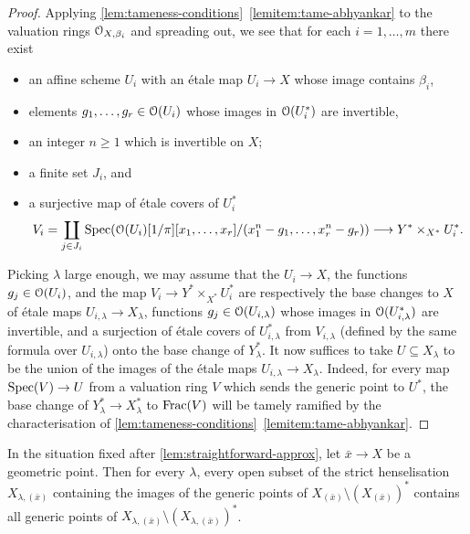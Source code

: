 \begin{proof}
Applying \cref{lem:tameness-conditions}~\ref{lemitem:tame-abhyankar} to the valuation rings ${\mathcal O}_{X,\beta_i}$ and spreading out, we see that for each $i=1,\dots, m$ there exist
\begin{itemize}
    \item 
    an affine scheme $U_i$ with an \'etale map $U_i\to X$ whose image contains $\beta_i$,
    \item 
    elements $g_1,\dots, g_r\in {\mathcal O}(U_i)$ whose images in ${\mathcal O}(U_i^*)$ are invertible,
    \item 
    an integer $n\geq 1$ which is invertible on $X$;
    \item 
    a finite set $J_i$, and  
    \item 
    a surjective map of \'etale covers of $U_i^*$
    \[
        V_i = \coprod_{j \in J_i} 
        \operatorname{Spec}({\mathcal O}(U_i)[1/\pi][x_1,\dots, x_r]/(x_1^{n} - g_1, \dots, x_r^{n} - g_r)) \longrightarrow Y^*\times_{X^*} U^*_i. 
    \]
\end{itemize}
Picking $\lambda$ large enough, we may assume that the $U_i\to X$, the functions $g_j\in {\mathcal O}(U_i)$, and the map $V_i\to Y^*\times_{X^*}U_i^*$ are respectively the base changes to $X$ of \'etale maps $U_{i,\lambda}\to X_\lambda$, functions $g_j\in {\mathcal O}(U_{i,\lambda})$ whose images in ${\mathcal O}(U_{i,\lambda}^*)$ are invertible, and a surjection of \'etale covers of $U_{i,\lambda}^*$ from $V_{i,\lambda}$ (defined by the same formula over $U_{i,\lambda}$) onto the base change of $Y^*_\lambda$. It now suffices to take $U \subseteq X_\lambda$ to be the union of the images of the \'etale maps $U_{i,\lambda}\to X_\lambda$. Indeed, for every map $\operatorname{Spec}(V)\to U$ from a valuation ring $V$ which sends the generic point to $U^*$, the base change of $Y^*_\lambda \to X^*_\lambda$ to ${\rm Frac}(V)$ will be tamely ramified by the characterisation of  \cref{lem:tameness-conditions}~\ref{lemitem:tame-abhyankar}.
\end{proof}

\begin{lem} \label{lem:generic-points-ugggh}
    In the situation fixed after  \cref{lem:straightforward-approx}, let $\bar x\to X$ be a geometric point. Then for every $\lambda$, every open subset of the strict henselisation $X_{\lambda,(\bar x)}$ containing the images of the generic points of $X_{(\bar x)}\setminus (X_{(\bar x)})^*$ contains all generic points of $X_{\lambda,(\bar x)} \setminus (X_{\lambda,(\bar x)})^*$.
\end{lem}

